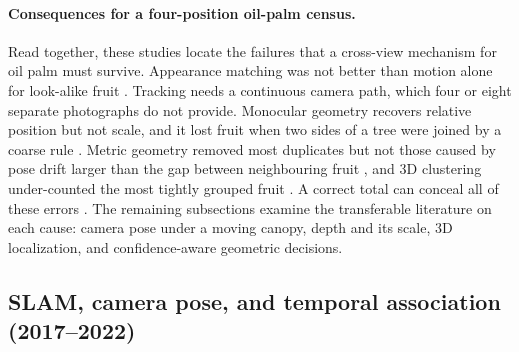 \paragraph{Consequences for a four-position oil-palm census.} Read together, these studies locate the failures that a cross-view mechanism for oil palm must survive. Appearance matching was not better than motion alone for look-alike fruit \cite{ledger_r_ee550a3e3a6fb318,ledger_r_2d972b94554c6cd1}. Tracking needs a continuous camera path, which four or eight separate photographs do not provide. Monocular geometry recovers relative position but not scale, and it lost fruit when two sides of a tree were joined by a coarse rule \cite{ledger_m_9966d81433d61ed3,ledger_r_00f82e0f404d691b}. Metric geometry removed most duplicates but not those caused by pose drift larger than the gap between neighbouring fruit \cite{ledger_r_d4270ea8ab11f268}, and 3D clustering under-counted the most tightly grouped fruit \cite{ledger_m_1210e3ea00486b68}. A correct total can conceal all of these errors \cite{ledger_r_700d34dae0f20d78}. The remaining subsections examine the transferable literature on each cause: camera pose under a moving canopy, depth and its scale, 3D localization, and confidence-aware geometric decisions.


\subsection{SLAM, camera pose, and temporal association (2017--2022)}

